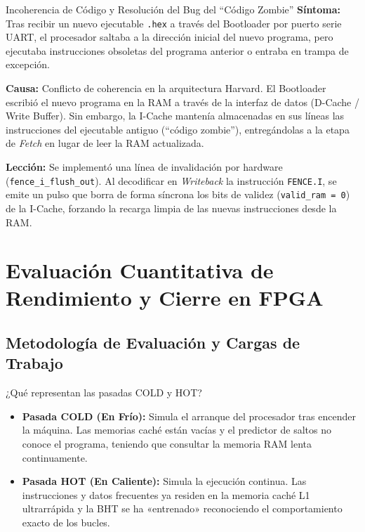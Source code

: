 \documentclass[10pt,a4paper]{article}
\begin{document}
\begin{bugbox}{Incoherencia de Código y Resolución del Bug del ``Código Zombie''}
    \textbf{Síntoma:} Tras recibir un nuevo ejecutable \texttt{.hex} a través del Bootloader por puerto serie UART, el procesador saltaba a la dirección inicial del
    nuevo programa, pero ejecutaba instrucciones obsoletas del programa anterior o entraba en trampa de excepción.

    \textbf{Causa:} Conflicto de coherencia en la arquitectura Harvard. El Bootloader escribió el nuevo programa en la RAM a través de la interfaz de datos
    (D-Cache / Write Buffer). Sin embargo, la I-Cache mantenía almacenadas en sus líneas las instrucciones del ejecutable antiguo (``código zombie''), entregándolas
    a la etapa de \textit{Fetch} en lugar de leer la RAM actualizada.

    \textbf{Lección:} Se implementó una línea de invalidación por hardware (\texttt{fence\_i\_flush\_out}). Al decodificar en \textit{Writeback}
    la instrucción \texttt{FENCE.I}, se emite un pulso que borra de forma síncrona los bits de validez (\texttt{valid\_ram = 0}) de la I-Cache, forzando la recarga
    limpia de las nuevas instrucciones desde la RAM.
\end{bugbox}


\section{Evaluación Cuantitativa de Rendimiento y Cierre en FPGA}

\subsection{Metodología de Evaluación y Cargas de Trabajo}

\begin{conceptbox}{¿Qué representan las pasadas COLD y HOT?}
\begin{itemize}
    \item \textbf{Pasada COLD (En Frío):} Simula el arranque del procesador tras encender la máquina. Las memorias caché están vacías y el predictor de saltos 
    no conoce el programa, teniendo que consultar la memoria RAM lenta continuamente.
    \item \textbf{Pasada HOT (En Caliente):} Simula la ejecución continua. Las instrucciones y datos frecuentes ya residen en la memoria caché L1 ultrarrápida 
    y la BHT se ha «entrenado» reconociendo el comportamiento exacto de los bucles.
\end{itemize}
\end{conceptbox}
\end{document}
